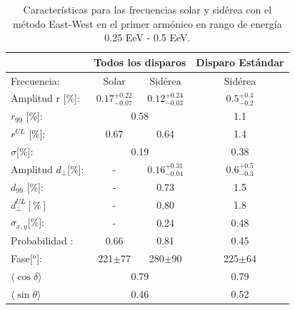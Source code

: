 \begin{table}[H]
    \begin{small}
        \begin{center}
            \begin{tabular}[c]{l|c|c||c|}
\cline{2-4}                                       & \multicolumn{2}{c||}{Todos los disparos}    & \multicolumn{1}{c|}{Disparo Estándar}   \\ \hline
\multicolumn{1}{|l|}{Frecuencia:                } & Solar	                & Sidérea	                & Sidérea \cite{Aab_2020}   \\ \hline
\multicolumn{1}{|l|}{Amplitud r [\%]:           } & $0.17^{+0.22}_{-0.07}$	& $0.12^{+0.24}_{-0.03}$ 	& $0.5^{+0.4}_{-0.2}$ \cite{codigo}      \\
\multicolumn{1}{|l|}{$r_{99}$ [\%]:             } & \multicolumn{2}{c||}{0.58}                          & 1.1\cite{codigo}                 \\
\multicolumn{1}{|l|}{$r^{UL}$ [\%]:             } & 0.67 	                & 0.64                      & 1.4\cite{codigo}                 \\ 
\multicolumn{1}{|l|}{$\sigma$[\%]:              } & \multicolumn{2}{c||}{0.19}                          & 0.38\cite{codigo}       \\\hline
\multicolumn{1}{|l|}{Amplitud $d_\perp$[\%]:    } & -	                    & $0.16^{+0.31}_{-0.04}$ 	& $0.6^{+0.5}_{-0.3}$       \\
\multicolumn{1}{|l|}{$d_{99}$ [\%]:             } & - 	                    & 0.73                      & 1.5  \cite{codigo}                \\
\multicolumn{1}{|l|}{$d_{\perp}^{UL}[\%]$       } & -                       & 0.80                      & 1.8                         \\
\multicolumn{1}{|l|}{$\sigma_{x,y}$[\%]:        } & -	                    & 0.24	                    & 0.48       \\\hline
\multicolumn{1}{|l|}{Probabilidad      :        } & 0.66                    & 0.81	                    & 0.45       \\
\multicolumn{1}{|l|}{Fase[$^o$]:                } & 221$\pm$77              & 280$\pm$90                & 225$\pm$64\\ \hline
\multicolumn{1}{|l|}{$\langle\cos\delta \rangle$} & \multicolumn{2}{c||}{0.79}        	                & 0.79 \cite{codigo}        \\        
\multicolumn{1}{|l|}{$\langle\sin\theta \rangle$} & \multicolumn{2}{c||}{0.46}        	                & 0.52 \cite{codigo}        \\ \hline       
            \end{tabular}
            
        \end{center}
    \end{small}
    \caption{Características para las frecuencias solar y sidérea con el método East-West en el primer armónico en rango de energía 0.25 EeV - 0.5 EeV.}
    \label{tab:primer_bin_data}
\end{table}


